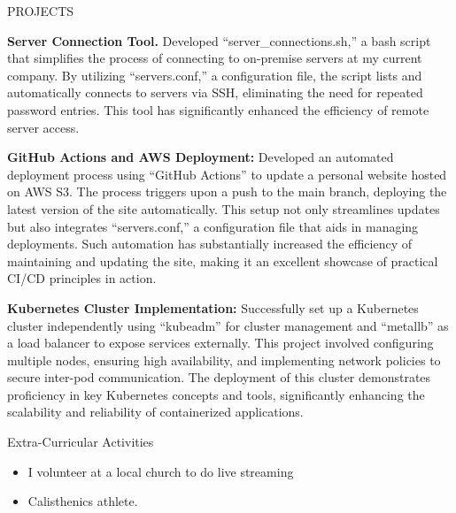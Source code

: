 \documentclass{resume} %
\begin{document}
\begin{rSection}{PROJECTS} 
\vspace{-1.25em}
\item \textbf{Server Connection Tool.} Developed ``server\_connections.sh,'' a bash script that simplifies the process of connecting to on-premise servers at my current company. By utilizing ``servers.conf,'' a configuration file, the script lists and automatically connects to servers via SSH, eliminating the need for repeated password entries. This tool has significantly enhanced the efficiency of remote server access.

\item \textbf{GitHub Actions and AWS Deployment:} Developed an automated deployment process using ``GitHub Actions'' to update a personal website hosted on AWS S3. The process triggers upon a push to the main branch, deploying the latest version of the site automatically. This setup not only streamlines updates but also integrates ``servers.conf,'' a configuration file that aids in managing deployments. Such automation has substantially increased the efficiency of maintaining and updating the site, making it an excellent showcase of practical CI/CD principles in action.

\item \textbf{Kubernetes Cluster Implementation:} Successfully set up a Kubernetes cluster independently using ``kubeadm'' for cluster management and ``metallb'' as a load balancer to expose services externally. This project involved configuring multiple nodes, ensuring high availability, and implementing network policies to secure inter-pod communication. The deployment of this cluster demonstrates proficiency in key Kubernetes concepts and tools, significantly enhancing the scalability and reliability of containerized applications.

\end{rSection}
\begin{rSection}{Extra-Curricular Activities} 
\begin{itemize}
    \item 	I volunteer at a local church to do live streaming 
    \item	Calisthenics athlete.
\end{itemize}


\end{rSection}

\end{document}
